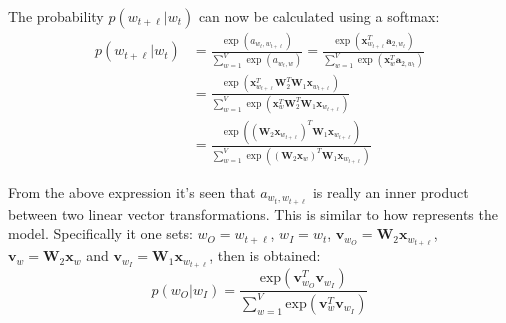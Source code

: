 The probability $p(w_{t + \ell} | w_t)$ can now be calculated using a softmax:
\begin{equation}
\begin{aligned}
p(w_{t + \ell} | w_t)
&= \frac{
	\exp(a_{w_t, w_{t + \ell}})
}{
	\sum_{w=1}^V \exp(a_{w_t, w})
}
= \frac{
	\exp( \mathbf{x}_{w_{t+\ell}}^T \mathbf{a}_{2,w_t} )
}{
	\sum_{w=1}^V \exp(\mathbf{x}_{w}^T \mathbf{a}_{2,w_t})
} \\
&= \frac{
	\exp( \mathbf{x}_{w_{t+\ell}}^T \mathbf{W}_2^T \mathbf{W}_1 \mathbf{x}_{w_{t+\ell}})
}{
	\sum_{w=1}^V \exp(\mathbf{x}_{w}^T \mathbf{W}_2^T \mathbf{W}_1 \mathbf{x}_{w_{t+\ell}})
} \\
&= \frac{
	\exp( \left(\mathbf{W}_2 \mathbf{x}_{w_{t+\ell}} \right)^T \mathbf{W}_1 \mathbf{x}_{w_{t+\ell}})
}{
	\sum_{w=1}^V \exp( \left(\mathbf{W}_2 \mathbf{x}_{w}\right)^T \mathbf{W}_1 \mathbf{x}_{w_{t+\ell}})
}
\end{aligned}
\end{equation}

From the above expression it's seen that $a_{w_t, w_{t + \ell}}$ is really an inner product between two linear vector transformations. This is similar to how \cite{word2vec-details} represents the model. Specifically it one sets: $w_O = w_{t + \ell}$, $w_I = w_t$, $\mathbf{v}_{w_O} = \mathbf{W}_2 \mathbf{x}_{w_{t+\ell}}$, $\mathbf{v}_{w} = \mathbf{W}_2 \mathbf{x}_{w}$ and $\mathbf{v}_{w_I} = \mathbf{W}_1 \mathbf{x}_{w_{t + \ell}}$, then \cite[eq. 2]{word2vec-details} is obtained:
\begin{equation}
p(w_O | w_I) = \frac{
	\mathrm{exp}( \mathbf{v}_{w_O}^T \mathbf{v}_{w_I} )
}{
	\sum_{w=1}^V \mathrm{exp}( \mathbf{v}_{w}^T \mathbf{v}_{w_I} )
}
\end{equation}
